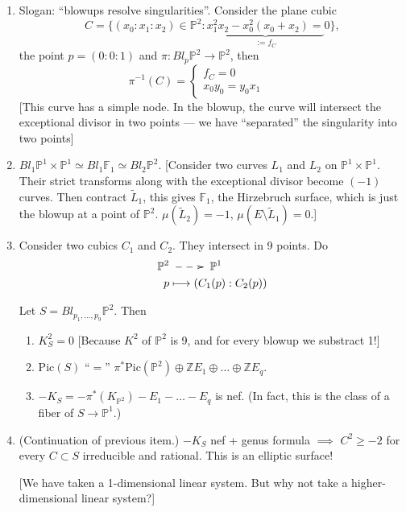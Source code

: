 \begin{enumerate}
\item Slogan: ``blowups resolve
singularities''.
Consider the plane cubic
$$
C=\{(x_0:x_1:x_2) \in \mathbb{P}^2:
\underbrace{x_1^2x_2-x_0^2(x_0+x_2)=}_{:=f_C}
0\},
$$
the point $p=(0:0:1)$
and $\pi:Bl_p\mathbb{P}^2 \to \mathbb{P}^2$,
then
$$
\pi^{-1}(C)=
\begin{cases}
f_C=0\qquad & \\
x_0y_0=y_0x_1\qquad &
\end{cases}
$$
[This curve has a simple node.
In the blowup, the curve will intersect
the exceptional divisor in two points ---
we have ``separated'' the singularity into
two points]

\item $Bl_1\mathbb{P}^1 \times \mathbb{P}^1
\simeq Bl_1 \mathbb{F}_1
\simeq Bl_2\mathbb{P}^2$.
[Consider two curves $L_1$ and $L_2$ on
$\mathbb{P}^1 \times \mathbb{P}^1$.
Their strict transforms along with the
exceptional divisor
become $(-1)$ curves.
Then contract $\tilde{L}_1$, this gives
$\mathbb{F}_1$,
the Hirzebruch surface, which is just the
blowup
at a point of $\mathbb{P}^2$.
$\mu(\tilde{L}_2)=-1$, $\mu(E\setminus
\tilde{L}_1)=0$.]

\item Consider two cubics $C_1$ and $C_2$.
They intersect in 9 points.
Do
$$
\begin{aligned}
\mathbb{P}^2 &\xymatrix{\ar@{-->}[r]&}
\mathbb{P}^1 \\
p &\longmapsto (C_1(p):C_2(p))
\end{aligned}
$$

\noindent
Let $S=Bl_{p_1,…,p_9}\mathbb{P}^2$.
Then
\begin{enumerate}
\item $K_S^2=0$ [Because $K^2$ of
$\mathbb{P}^2$ is 9,
and for every blowup we substract 1!]
\item $\text{Pic}(S)$  ``$=$''
$\pi^*\text{Pic}(\mathbb{P}^2)
\oplus\mathbb{Z}E_1 \oplus … \oplus
\mathbb{Z}E_q$.
\item $-K_S=-\pi^* (K_{\mathbb{P}^2})
-E_1-…-E_q$ is nef.
(In fact, this is the class of a fiber of $S
\to \mathbb{P}^1$.)
\end{enumerate}

\item (Continuation of previous item.)
$-K_S$ nef + genus formula  $\implies $
$C^2 \geq -2$ for every $C\subset S$
irreducible and rational.
This is an elliptic surface!

[We have taken a 1-dimensional linear system.
But why not take a higher-dimensional linear
system?]


\end{enumerate}
